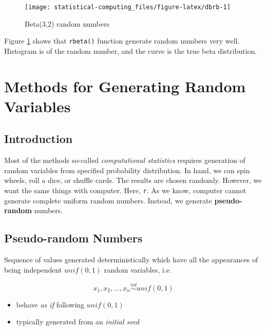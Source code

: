 \documentclass[]{book}
\providecommand{\tightlist}{%
  \setlength{\itemsep}{0pt}\setlength{\parskip}{0pt}}
\theoremstyle{definition}
\theoremstyle{definition}
\theoremstyle{definition}
\theoremstyle{remark}
\let\BeginKnitrBlock\begin \let\EndKnitrBlock\end
\begin{document}
\begin{figure}[H]

{\centering \texttt{[image: statistical-computing\_files/figure-latex/dbrb-1]} 

}

\caption{Beta(3,2) random numbers}\label{fig:dbrb}
\end{figure}

Figure \ref{fig:dbrb} shows that \texttt{rbeta()} function generate
random numbers very well. Histogram is of the random number, and the
curve is the true beta distribution.

\chapter{Methods for Generating Random Variables}\label{rvar}

\section{Introduction}\label{introduction}

Most of the methods so-called \emph{computational statistics} requires
generation of random variables from specified probability distribution.
In hand, we can spin wheels, roll a dice, or shuffle cards. The results
are chosen randomly. However, we want the same things with computer.
Here, \texttt{r}. As we know, computer cannot generate complete uniform
random numbers. Instead, we generate \textbf{pseudo-random} numbers.

\section{Pseudo-random Numbers}\label{pseudo-random-numbers}

\BeginKnitrBlock{definition}[Pseudo-random numbers]
\protect\hypertarget{def:unnamed-chunk-5}{}{\label{def:unnamed-chunk-5}
\iffalse (Pseudo-random numbers) \fi{} }Sequence of values generated
deterministically which have all the appearances of being independent
\(unif(0, 1)\) random variables, i.e.

\[x_1, x_2, \ldots, x_n \stackrel{iid}{\sim} unif(0, 1)\]
\EndKnitrBlock{definition}

\begin{itemize}
\tightlist
\item
  behave \emph{as if} following \(unif(0, 1)\)
\item
  typically generated from an \emph{initial seed}
\end{itemize}
\end{document}
